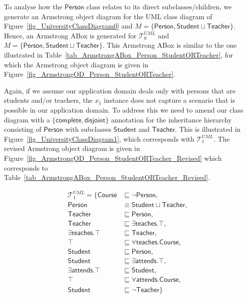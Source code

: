 \documentclass{amsart}
\begin{document}
    
     To analyse how the $\mathsf{Person}$ class relates to its direct subclasses/children, we generate an Armstrong object diagram for the UML class diagram of Figure~\ref{fig_UniversityClassDiagram0} and $M = \{\mathsf{Person}, \mathsf{Student} \sqcup \mathsf{Teacher}\}$. Hence, an Armstrong ABox is generated for $\mathcal{T}_0^{UML}$ and $M = \{\mathsf{Person}, \mathsf{Student} \sqcup \mathsf{Teacher}\}$. This Armstrong ABox is similar to the one illustrated in Table~\ref{tab_ArmstrongABox_Person_StudentORTeacher}, for which the Armstrong object diagram is given in Figure~\ref{fig_ArmstrongOD_Person_StudentORTeacher}. 
     
     Again, if we assume our application domain deals only with persons that are students and/or teachers, the $x_1$ instance does not capture a scenario that is possible in our application domain. To address this we need to amend our class diagram with a $\{\mathsf{complete}, \mathsf{disjoint}\}$ annotation for the inheritance hierarchy consisting of $\mathsf{Person}$ with subclasses $\mathsf{Student}$ and $\mathsf{Teacher}$.  This is illustrated in Figure~\ref{fig_UniversityClassDiagram1}, which corresponds with $\mathcal{T}_1^{UML}$. The revised Armstrong object diagram is given in Figure~\ref{fig_ArmstrongOD_Person_StudentORTeacher_Revised} which corresponds to Table~\ref{tab_ArmstrongABox_Person_StudentORTeacher_Revised}.
     
    \begin{align*}
	\mathcal{T}_1^{UML} = \{\mathsf{Course} &\sqsubseteq \neg \mathsf{Person},\\
	\mathsf{Person} &\equiv \mathsf{Student} \sqcup \mathsf{Teacher}, \\   
    \mathsf{Teacher} &\sqsubseteq \mathsf{Person}, \\
	\mathsf{Teacher} &\sqsubseteq \exists \mathsf{teaches}.\top, \\
	\exists\mathsf{teaches}.\top &\sqsubseteq \mathsf{Teacher}, \\
	\top &\sqsubseteq \forall \mathsf{teaches}.\mathsf{Course}, \\
	\mathsf{Student} &\sqsubseteq \mathsf{Person},\\
	\mathsf{Student} &\sqsubseteq \exists \mathsf{attends}.\top, \\
	\exists\mathsf{attends}.\top &\sqsubseteq \mathsf{Student}, \\
	\top &\sqsubseteq \forall \mathsf{attends}.\mathsf{Course}, \\
	\mathsf{Student} &\sqsubseteq \neg \mathsf{Teacher}\}
   \end{align*}     
     
\end{document}
